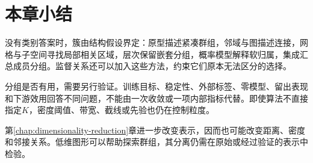 \section{本章小结}
\label{sec:clustering-summary}

没有类别答案时，簇由结构假设界定：原型描述紧凑群组，邻域与图描述连接，网格与子空间寻找局部相关区域，层次保留嵌套分组，概率模型解释软归属，集成汇总成员分组。监督关系还可以加入这些方法，约束它们原本无法区分的选择。

分组是否有用，需要另行验证。训练目标、稳定性、外部标签、零模型、留出表现和下游效用回答不同问题，不能由一次收敛或一项内部指标代替。即使算法不直接指定$K$，密度阈值、带宽、截线或先验也仍在控制粒度。

第\ref{chap:dimensionality-reduction}章进一步改变表示，因而也可能改变距离、密度和邻接关系。低维图形可以帮助探索群组，其分离仍需在原始或经过验证的表示中检验。

